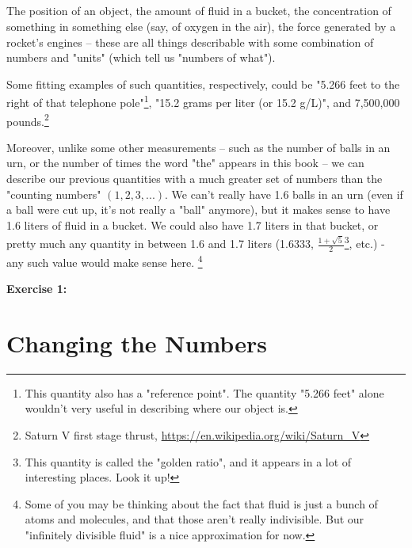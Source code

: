 \documentclass{article}
\begin{document}
\subsection{}

The position of an object, the amount of fluid in a bucket, the concentration of something in something else (say, of oxygen in the air), the force generated by a rocket's engines -- these are all things describable with some combination of numbers and "units" (which tell us "numbers of what"). 


Some fitting examples of such quantities, respectively, could be "5.266 feet to the right of that telephone pole"\footnote{This quantity also has a "reference point". The quantity "5.266 feet" alone wouldn't very useful in describing where our object is.}, "15.2 grams per liter (or 15.2 g/L)", and 7,500,000 pounds.\footnote{Saturn V first stage thrust, \url{https://en.wikipedia.org/wiki/Saturn_V}}



Moreover, unlike some other measurements -- such as the number of balls in an urn, or the number of times the word "the" appears in this book -- we can describe our previous quantities with a much greater set of numbers than the "counting numbers" $(1, 2, 3, ...)$. We can't really have 1.6 balls in an urn (even if a ball were cut up, it's not really a "ball" anymore), but it makes sense to have 1.6 liters of fluid in a bucket. We could also have 1.7 liters in that bucket, or pretty much any quantity in between 1.6 and 1.7 liters (1.6333, $\frac{1 + \sqrt{5}}{2}$\footnote{This quantity is called the "golden ratio", and it appears in a lot of interesting places. Look it up!}, etc.) - any such value would make sense here. \footnote{Some of you may be thinking about the fact that fluid is just a bunch of atoms and molecules, and that those aren't really indivisible. But our "infinitely divisible fluid" is a nice approximation for now.}


\textbf{Exercise 1:} 



\section{Changing the Numbers}
\end{document}
